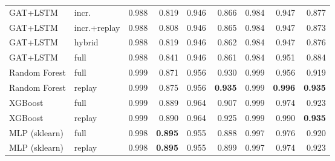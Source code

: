 \documentclass[twocolumn]{llncs}
\begin{document}
\begin{table}[!t]
\begin{tabular}{|l|l|r|r|r|r|r|r|r|}
GAT+LSTM           & incr.& 0.988 & 0.819 & 0.946 & 0.866 & 0.984 & 0.947 & 0.877 \\
GAT+LSTM           & incr.+replay & 0.988 & 0.808 & 0.946 & 0.865 & 0.984 & 0.947 & 0.873 \\
GAT+LSTM           & hybrid & 0.988 & 0.819 & 0.946 & 0.862 & 0.984 & 0.947 & 0.876 \\
GAT+LSTM           & full & 0.988 & 0.841 & 0.946 & 0.861 & 0.984 & 0.951 & 0.884 \\
\hline
Random Forest      & full & 0.999 & 0.871 & 0.956 & 0.930 & 0.999 & 0.956 & 0.919 \\
Random Forest      & replay & 0.999 & 0.875 & 0.956 & \textbf{0.935} & 0.999 & \textbf{0.996} & \textbf{0.935} \\
XGBoost            & full & 0.999 & 0.889 & 0.964 & 0.907 & 0.999 & 0.974 & 0.923 \\
XGBoost            & replay & 0.999 & 0.890 & 0.964 & 0.925 & 0.999 & 0.990 & \textbf{0.935} \\
MLP (sklearn)      & full & 0.998 & \textbf{0.895} & 0.955 & 0.888 & 0.997 & 0.976 & 0.920 \\
MLP (sklearn)      & replay & 0.998 & \textbf{0.895} & 0.955 & 0.899 & 0.997 & 0.974 & 0.923 \\
\hline
\end{tabular}
\end{table}
\end{document}
